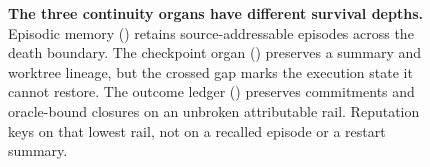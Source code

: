 \begin{figure}[H]
{}
\caption{\textbf{The three continuity organs have different survival depths.}
Episodic memory (\BUILT) retains source-addressable episodes across the death
boundary. The checkpoint organ (\BUILTWEAK) preserves a summary and worktree
lineage, but the crossed gap marks the execution state it cannot restore. The
outcome ledger (\BUILTWEAK) preserves commitments and oracle-bound closures on an
unbroken attributable rail. Reputation keys on that lowest rail, not on a recalled
episode or a restart summary.}
\label{fig:organs}
\end{figure}
